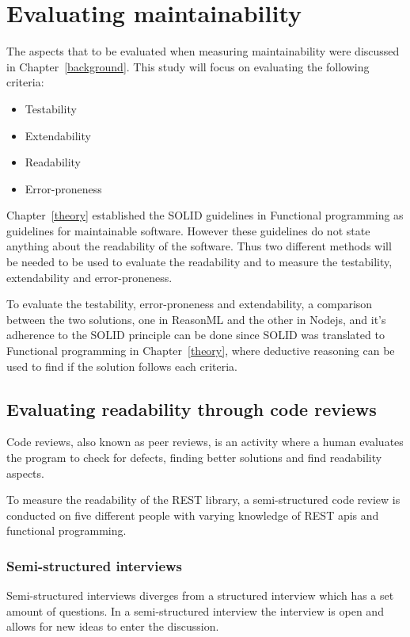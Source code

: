 \section{Evaluating maintainability}

The aspects that to be evaluated when measuring maintainability were discussed
in Chapter~\ref{background}. This study will focus on evaluating the following
criteria:

\begin{itemize}
    \item Testability
    \item Extendability
    \item Readability
    \item Error-proneness
\end{itemize}

Chapter~\ref{theory} established the SOLID guidelines in Functional programming
as guidelines for maintainable software. However these guidelines do not state
anything about the readability of the software. Thus two different methods will
be needed to be used to evaluate the readability and to measure the testability,
extendability and error-proneness.

To evaluate the testability, error-proneness and extendability, a comparison
between the two solutions, one in ReasonML and the other in Nodejs, and it's
adherence to the SOLID principle can be done since SOLID was translated to
Functional programming in Chapter~\ref{theory}, where deductive reasoning can be
used to find if the solution follows each criteria. 

\subsection{Evaluating readability through code reviews}

Code reviews, also known as peer reviews, is an activity where a human evaluates
the program to check for defects, finding better solutions and find readability
aspects. 

To measure the readability of the REST library, a semi-structured code review is
conducted on five different people with varying knowledge of REST apis and
functional programming.

\subsubsection{Semi-structured interviews}

Semi-structured interviews diverges from a structured interview which has a set
amount of questions. In a semi-structured interview the interview is open and
allows for new ideas to enter the discussion. 

